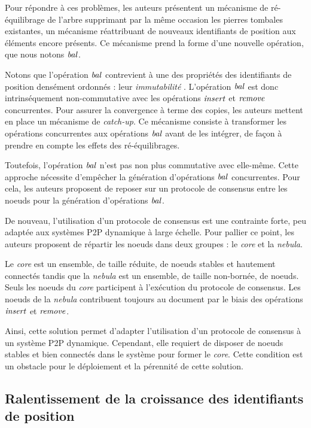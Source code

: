 Pour répondre à ces problèmes, les auteurs présentent un mécanisme de ré-équilibrage de l'arbre supprimant par la même occasion les pierres tombales existantes, \ie un mécanisme réattribuant de nouveaux identifiants de position aux éléments encore présents.
Ce mécanisme prend la forme d'une nouvelle opération, que nous notons $\mathit{bal}$.

Notons que l'opération $\mathit{bal}$ contrevient à une des propriétés des identifiants de position densément ordonnés : leur \emph{immutabilité} .
L'opération $\mathit{bal}$ est donc intrinséquement non-commutative avec les opérations $\mathit{insert}$ et $\mathit{remove}$ concurrentes.
Pour assurer la convergence à terme des copies, les auteurs mettent en place un mécanisme de \emph{catch-up}.
Ce mécanisme consiste à transformer les opérations concurrentes aux opérations $\mathit{bal}$ avant de les intégrer, de façon à prendre en compte les effets des ré-équilibrages.

Toutefois, l'opération $\mathit{bal}$ n'est pas non plus commutative avec elle-même.
Cette approche nécessite d'empêcher la génération d'opérations $\mathit{bal}$ concurrentes.
Pour cela, les auteurs proposent de reposer sur un protocole de consensus entre les noeuds pour la génération d'opérations $\mathit{bal}$.

De nouveau, l'utilisation d'un protocole de consensus est une contrainte forte, peu adaptée aux systèmes \ac{P2P} dynamique à large échelle.
Pour pallier ce point, les auteurs proposent de répartir les noeuds dans deux groupes : le \emph{core} et la \emph{nebula}.

Le \emph{core} est un ensemble, de taille réduite, de noeuds stables et hautement connectés tandis que la \emph{nebula} est un ensemble, de taille non-bornée, de noeuds.
Seuls les noeuds du \emph{core} participent à l'exécution du protocole de consensus.
Les noeuds de la \emph{nebula} contribuent toujours au document par le biais des opérations $\mathit{insert}$ et $\mathit{remove}$.

Ainsi, cette solution permet d'adapter l'utilisation d'un protocole de consensus à un système \ac{P2P} dynamique.
Cependant, elle requiert de disposer de noeuds stables et bien connectés dans le système pour former le \emph{core}.
Cette condition est un obstacle pour le déploiement et la pérennité de cette solution.

\subsection{Ralentissement de la croissance des identifiants de position}
\label{sec:etat-art-lseq}


